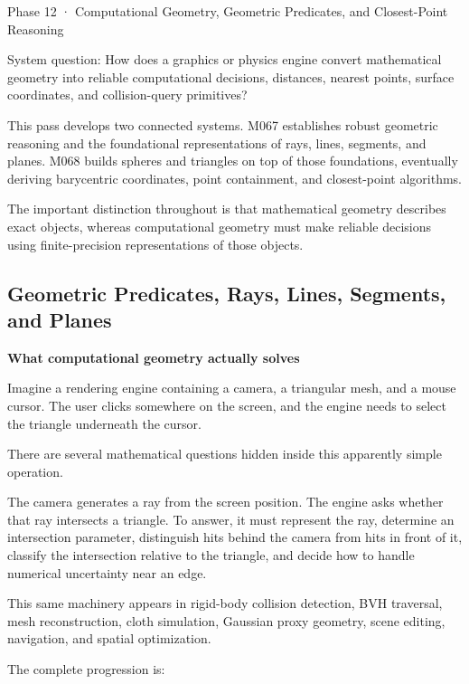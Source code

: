 Phase 12 · Computational Geometry, Geometric Predicates, and Closest-Point Reasoning

System question: How does a graphics or physics engine convert mathematical geometry into reliable computational decisions, distances, nearest points, surface coordinates, and collision-query primitives?

This pass develops two connected systems. M067 establishes robust geometric reasoning and the foundational representations of rays, lines, segments, and planes. M068 builds spheres and triangles on top of those foundations, eventually deriving barycentric coordinates, point containment, and closest-point algorithms.

The important distinction throughout is that mathematical geometry describes exact objects, whereas computational geometry must make reliable decisions using finite-precision representations of those objects.

\subsection{Geometric Predicates, Rays, Lines, Segments, and Planes}\label{03-visual-computing-i-ch020-geometric-predicates-rays-lines-segments-and-planes}

\hypertarget{03-visual-computing-i-ch020-geometric-predicates-rays-lines-segments-and-planes}{}

\textbf{What computational geometry actually solves}

Imagine a rendering engine containing a camera, a triangular mesh, and a mouse cursor. The user clicks somewhere on the screen, and the engine needs to select the triangle underneath the cursor.

There are several mathematical questions hidden inside this apparently simple operation.

The camera generates a ray from the screen position. The engine asks whether that ray intersects a triangle. To answer, it must represent the ray, determine an intersection parameter, distinguish hits behind the camera from hits in front of it, classify the intersection relative to the triangle, and decide how to handle numerical uncertainty near an edge.

This same machinery appears in rigid-body collision detection, BVH traversal, mesh reconstruction, cloth simulation, Gaussian proxy geometry, scene editing, navigation, and spatial optimization.

The complete progression is:

